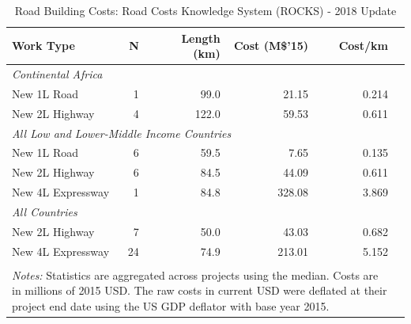 \documentclass[a4paper]{article}
\begin{document}
\begin{table}[H] %
\centering
\caption{\label{tab:ROCKS} Road Building Costs: Road Costs Knowledge System (ROCKS) - 2018 Update}
\vspace{2mm}
\begin{tabular}{lrrrrr}
  \toprule
Work Type & N & Length (km) & Cost (M\$'15) & Cost/km \\ 
  \midrule
 \multicolumn{5}{l}{\textit{Continental Africa}} \\ 
    New 1L Road & 1 & 99.0 & 21.15 & 0.214 \\ 
 New 2L Highway & 4 & 122.0 & 59.53 & 0.611 \\ 
  \midrule  \multicolumn{5}{l}{\textit{All Low and Lower-Middle Income Countries}} \\ 
  New 1L Road & 6 & 59.5 & 7.65 & 0.135 \\ 
  New 2L Highway & 6 & 84.5 & 44.09 & 0.611 \\ 
  New 4L Expressway & 1 & 84.8 & 328.08 & 3.869 \\ \midrule
 \multicolumn{5}{l}{\textit{All Countries}} \\ 
  New 2L Highway & 7 & 50.0 & 43.03 & 0.682 \\     
  New 4L Expressway & 24 & 74.9 & 213.01 & 5.152 \\ 
   \bottomrule  \\ [-0.9em]
\multicolumn{5}{l}{\parbox{0.7\textwidth}{\footnotesize
\textit{Notes:} Statistics are aggregated across projects using the median. Costs are in millions of 2015 USD. The raw costs in current USD were deflated at their project end date using the US GDP deflator with base year 2015.  }}
\end{tabular}
\end{table}
\end{document}
